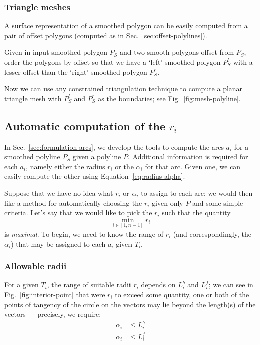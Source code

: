 \documentclass{article}
\begin{document}
\subsubsection{Triangle meshes}
%
A surface representation of a smoothed polygon can be easily computed from a pair of offset polygons (computed as in Sec.~\ref{sec:offset-polylines}).

Given in input smoothed polygon $P_S$ and two smooth polygons offset from $P_S$, order the polygons by offset so that we have a `left' smoothed polygon $P^l_S$ with a lesser offset than the `right' smoothed polygon $P^r_S$.

Now we can use any constrained triangulation technique to compute a planar triangle mesh with $P^l_S$ and $P^r_S$ as the boundaries; see Fig.~\ref{fig:mesh-polyline}.
%
\subsection{Automatic computation of the $r_i$}
%
In Sec.~\ref{sec:formulation-arcs}, we develop the tools to compute the arcs $a_{i}$ for a smoothed polyline $P_{S}$ given a polyline $P$.  Additional information is required for each $a_{i}$, namely either the radius $r_{i}$ or the $\alpha_i$ for that arc.  Given one, we can easily compute the other using Equation~\eqref{eq:radius-alpha}.

Suppose that we have no idea what $r_{i}$ or $\alpha_{i}$ to assign to each arc; we would then like a method for automatically choosing the $r_{i}$ given only $P$ and some simple criteria.  Let's say that we would like to pick the $r_{i}$ such that the quantity
%
\begin{equation}
  \label{eq:optimize-radius}
  \min_{i \in [1, n-1]} r_{i}
\end{equation}
%
is \emph{maximal}.  To begin, we need to know the range of $r_{i}$ (and correspondingly, the $\alpha_{i}$) that may be assigned to each $a_{i}$ given $T_{i}$.
%
\subsubsection{Allowable radii}
\label{sec:allowable-radii}
%
For a given $T_{i}$, the range of suitable radii $r_{i}$ depends on $L^b_i$ and $L^f_i$; we can see in Fig.~\ref{fig:interior-point} that were $r_{i}$ to exceed some quantity, one or both of the points of tangency of the circle on the vectors may lie beyond the length(s) of the vectors --- precisely, we require:
%
\begin{align}
  \label{eq:alphalimit-b}
  \alpha_i &\le L^{b}_{i}\\
  \label{eq:alphalimit-f}
  \alpha_i &\le L^{f}_{i}
\end{align}
%
\end{document}
